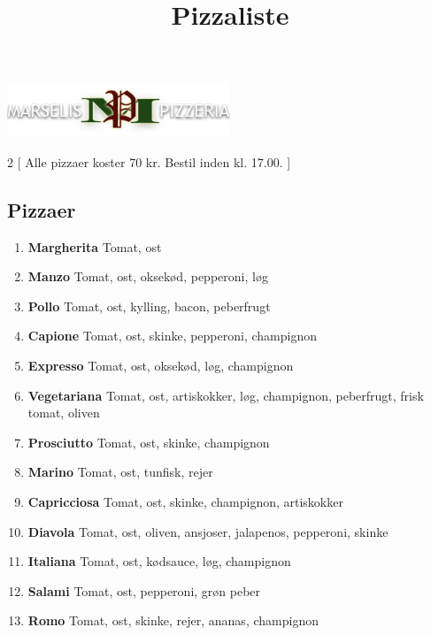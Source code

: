 \documentclass[danish,a4paper]{article}
\title{Pizzaliste}
\date{\vspace{-10ex}}
\author{\vspace{-10ex}}
\begin{document}

\maketitle

\begin{center}
    \includegraphics[width=0.5\textwidth]{logo.png}
\end{center}

\begin{multicols}{2}
[
\noindent Alle pizzaer koster 70 kr. Bestil inden kl. 17.00.
]
\subsection*{Pizzaer}
\begin{enumerate}[label={\large\textbf{\arabic*}.}]
    \setcounter{enumi}{0}
    \item \textbf{\textcolor{vegigreen}{Margherita}} Tomat, ost
    \item \textbf{Manzo} Tomat, ost, oksekød, pepperoni, løg
    \item \textbf{Pollo} Tomat, ost, kylling, bacon, peberfrugt
    \item \textbf{Capione} Tomat, ost, skinke, pepperoni, champignon
    \item \textbf{Expresso} Tomat, ost, oksekød, løg, champignon
    \item \textbf{\textcolor{vegigreen}{Vegetariana}} Tomat, ost, artiskokker, løg, champignon, peberfrugt, frisk tomat, oliven
    \item \textbf{Prosciutto} Tomat, ost, skinke, champignon
    \item \textbf{Marino} Tomat, ost, tunfisk, rejer
    \item \textbf{Capricciosa} Tomat, ost, skinke, champignon, artiskokker
    \item \textbf{Diavola} Tomat, ost, oliven, ansjoser, jalapenos, pepperoni, skinke
    \item \textbf{Italiana} Tomat, ost, kødsauce, løg, champignon
    \item \textbf{Salami} Tomat, ost, pepperoni, grøn peber
    \item \textbf{Romo} Tomat, ost, skinke, rejer, ananas, champignon

\end{enumerate}
\end{multicols}
\end{document}
